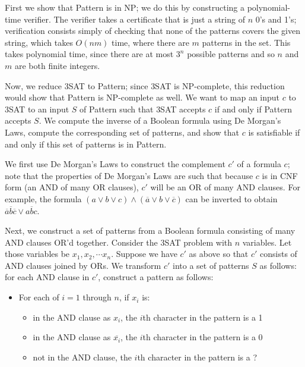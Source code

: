 \documentclass[solution, letterpaper]{cs121}
\begin{document}
\begin{solution}
First we show that {\sc Pattern} is in NP; we do this by constructing a polynomial-time verifier.  The verifier takes a certificate that is just a string of $n$ 0's and 1's; verification consists simply of checking that none of the patterns covers the given string, which takes $O(nm)$ time, where there are $m$ patterns in the set.  This takes polynomial time, since there are at most $3^n$ possible patterns and so $n$ and $m$ are both finite integers.

Now, we reduce {\sc 3SAT} to {\sc Pattern}; since {\sc 3SAT} is NP-complete, this reduction would show that {\sc Pattern} is NP-complete as well.  We want to map an input $c$ to {\sc 3SAT} to an input $S$ of {\sc Pattern} such that {\sc 3SAT} accepts $c$ if and only if {\sc Pattern} accepts $S$.  We compute the inverse of a Boolean formula using De Morgan's Laws, compute the corresponding set of patterns, and show that $c$ is satisfiable if and only if this set of patterns is in {\sc Pattern}.

We first use De Morgan's Laws to construct the complement $c'$ of a formula $c$; note that the properties of De Morgan's Laws are such that because $c$ is in CNF form (an AND of many OR clauses), $c'$ will be an OR of many AND clauses.  For example, the formula $(a \vee b \vee c) \wedge (\overline{a} \vee b \vee \overline{c})$ can be inverted to obtain $\overline{a}\overline{b}\overline{c} \vee a\overline{b}c$.

Next, we construct a set of patterns from a Boolean formula consisting of many AND clauses OR'd together.  Consider the {\sc 3SAT} problem with $n$ variables.  Let those variables be $x_1, x_2, \cdots x_n$.  Suppose we have $c'$ as above so that $c'$ consists of AND clauses joined by ORs.  We transform $c'$ into a set of patterns $S$ as follows: for each AND clause in $c'$, construct a pattern as follows:
\begin{itemize}
	\setlength\itemsep{0cm}
	\item For each of $i = 1$ through $n$, if $x_i$ is:
	\begin{itemize}
		\item in the AND clause as $x_i$, the $i$th character in the pattern is a 1
		\item in the AND clause as $\overline{x_i}$, the $i$th character in the pattern is a 0
		\item not in the AND clause, the $i$th character in the pattern is a ?
	\end{itemize}
\end{itemize}


\end{solution}
\end{document}
